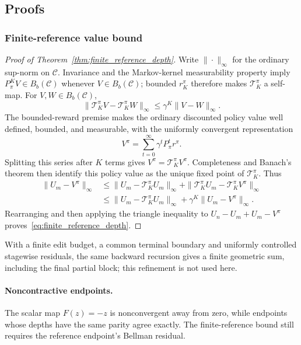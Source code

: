 \documentclass{article}
\theoremstyle{plain}
\theoremstyle{definition}
\theoremstyle{remark}
\begin{document}
\subsection{Proofs}
\label{app:proofs}



\subsubsection{Finite-reference value bound}
\label{app:proof_finite_reference}

\begin{proof}[Proof of Theorem~\ref{thm:finite_reference_depth}]
Write $\|\cdot\|_\infty$ for the ordinary sup-norm on
$\mathcal C$. Invariance and the Markov-kernel measurability property imply
$P_\pi^K V\in B_b(\mathcal C)$ whenever $V\in B_b(\mathcal C)$; bounded
$r_K^\pi$ therefore makes $\mathcal T_K^\pi$ a self-map. For
$V,W\in B_b(\mathcal C)$,
\[
\|\mathcal T_K^\pi V-\mathcal T_K^\pi W\|_\infty
\le\gamma^K\|V-W\|_\infty.
\]
The bounded-reward premise makes the ordinary discounted policy value
well defined, bounded, and measurable, with the uniformly convergent
representation
\[
V^\pi=\sum_{t=0}^\infty \gamma^t P_\pi^t r^\pi.
\]
Splitting this series after $K$ terms gives
$V^\pi=\mathcal T_K^\pi V^\pi$. Completeness and Banach's theorem then
identify this policy value as the unique fixed point of
$\mathcal T_K^\pi$.
Thus
\begin{align*}
\|U_m-V^\pi\|_\infty
&\le \|U_m-\mathcal T_K^\pi U_m\|_\infty
+\|\mathcal T_K^\pi U_m-\mathcal T_K^\pi V^\pi\|_\infty \\
&\le \|U_m-\mathcal T_K^\pi U_m\|_\infty
+\gamma^K\|U_m-V^\pi\|_\infty.
\end{align*}
Rearranging and then applying the triangle inequality to
$U_n-U_m+U_m-V^\pi$ proves~\eqref{eq:finite_reference_depth}.
\end{proof}

With a finite edit budget, a common terminal boundary and uniformly controlled
stagewise residuals, the same backward recursion gives a finite geometric
sum, including the final partial block; this refinement is not used here.

\paragraph{Noncontractive endpoints.}
\label{app:finite_endpoint_remarks}
\label{rem:noncontractive_endpoints}
The scalar map $F(z)=-z$ is nonconvergent away from zero, while endpoints
whose depths have the same parity agree exactly. The finite-reference bound
still requires the reference endpoint's Bellman residual.
\end{document}
